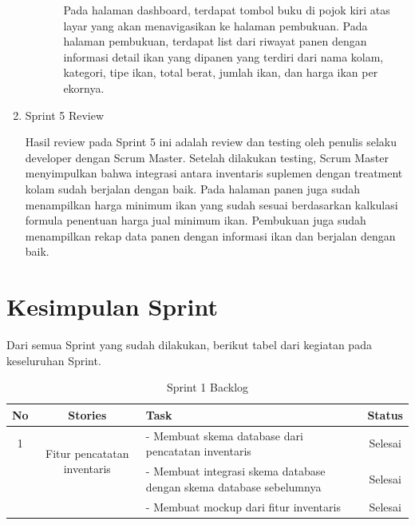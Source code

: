\begin{spacing}{1.5}
\begin{enumerate}
\begin{enumerate}
\begin{itemize}
				Pada halaman dashboard, terdapat tombol buku di pojok kiri atas layar yang akan menavigasikan ke halaman pembukuan. Pada halaman pembukuan, terdapat list dari riwayat panen dengan informasi detail ikan yang dipanen yang terdiri dari nama kolam, kategori, tipe ikan, total berat, jumlah ikan, dan harga ikan per ekornya.
			\end{itemize}
		\end{enumerate}

		\item Sprint 5 Review
		
		Hasil review pada Sprint 5 ini adalah review dan testing oleh penulis selaku developer dengan Scrum Master. Setelah dilakukan testing, Scrum Master menyimpulkan bahwa integrasi antara inventaris suplemen dengan treatment kolam sudah berjalan dengan baik. Pada halaman panen juga sudah menampilkan harga minimum ikan yang sudah sesuai berdasarkan kalkulasi formula penentuan harga jual minimum ikan. Pembukuan juga sudah menampilkan rekap data panen dengan informasi ikan dan berjalan dengan baik.
 
	\end{enumerate}

\section{Kesimpulan Sprint}

Dari semua Sprint yang sudah dilakukan, berikut tabel dari kegiatan pada keseluruhan Sprint. 

\begin{table}[H]	
	\begin{center}
		\caption{Sprint 1 Backlog}
		\label{tab:table6}
		\begin{tabular}{|c|c|m{13em}|c|}
		\hline
		\textbf{No} & \textbf{Stories} & \textbf{Task} & \textbf{Status} \\
		\hline
		1 & \multirow{2}{12em}{Fitur pencatatan inventaris} & - Membuat skema database dari pencatatan inventaris & Selesai \\
		&  & - Membuat integrasi skema database dengan skema database sebelumnya & Selesai \\
		&  & - Membuat mockup dari fitur inventaris & Selesai \\
		\hline
		\end{tabular}
	\end{center}
\end{table}


\end{spacing}
